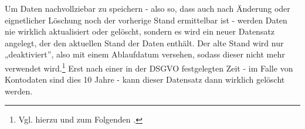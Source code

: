 \bigbreak
\bigbreak

\noindent
Um Daten nachvollziebar zu speichern - also so, dass auch nach Änderung oder eignetlicher Löschung noch der vorherige Stand ermittelbar ist - werden Daten nie wirklich aktualisiert oder gelöscht, sondern es wird ein neuer Datensatz angelegt, der den aktuellen Stand der Daten enthält.
Der alte Stand wird nur „deaktiviert”, also mit einem Ablaufdatum versehen, sodass dieser nicht mehr verwendet wird.\footnote{Vgl. hierzu und zum Folgenden \pageref{i1:f2}.}
Erst nach einer in der DSGVO festgelegten Zeit - im Falle von Kontodaten sind dies 10 Jahre - kann dieser Datensatz dann wirklich gelöscht werden.


